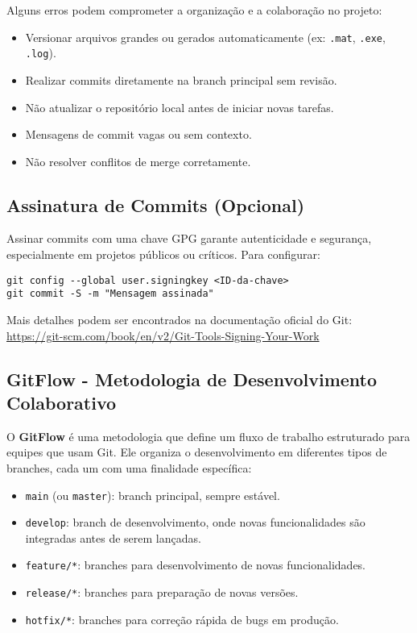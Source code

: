 Alguns erros podem comprometer a organização e a colaboração no projeto:
\begin{itemize}
    \item Versionar arquivos grandes ou gerados automaticamente (ex: \texttt{.mat}, \texttt{.exe}, \texttt{.log}).
    \item Realizar commits diretamente na branch principal sem revisão.
    \item Não atualizar o repositório local antes de iniciar novas tarefas.
    \item Mensagens de commit vagas ou sem contexto.
    \item Não resolver conflitos de merge corretamente.
\end{itemize}

\subsection{Assinatura de Commits (Opcional)}

Assinar commits com uma chave GPG garante autenticidade e segurança, especialmente em projetos públicos ou críticos. Para configurar:
\begin{lstlisting}[style=shellstyle]
git config --global user.signingkey <ID-da-chave>
git commit -S -m "Mensagem assinada"
\end{lstlisting}
Mais detalhes podem ser encontrados na documentação oficial do Git: \url{https://git-scm.com/book/en/v2/Git-Tools-Signing-Your-Work}

\subsection{GitFlow - Metodologia de Desenvolvimento Colaborativo}

O \textbf{GitFlow} é uma metodologia que define um fluxo de trabalho estruturado para equipes que usam Git. Ele organiza o desenvolvimento em diferentes tipos de branches, cada um com uma finalidade específica:
\begin{itemize}
    \item \texttt{main} (ou \texttt{master}): branch principal, sempre estável.
    \item \texttt{develop}: branch de desenvolvimento, onde novas funcionalidades são integradas antes de serem lançadas.
    \item \texttt{feature/*}: branches para desenvolvimento de novas funcionalidades.
    \item \texttt{release/*}: branches para preparação de novas versões.
    \item \texttt{hotfix/*}: branches para correção rápida de bugs em produção.
\end{itemize}

